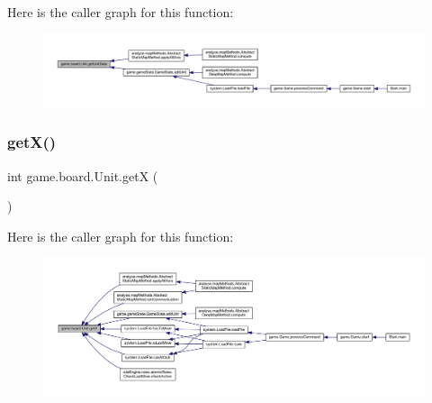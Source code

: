 Here is the caller graph for this function\+:
\nopagebreak
\begin{figure}[H]
\begin{center}
\leavevmode
\includegraphics[width=350pt]{classgame_1_1board_1_1_unit_a165d186d9ffb91527d90807134dbe212_icgraph}
\end{center}
\end{figure}
\mbox{\label{classgame_1_1board_1_1_unit_a83e3e2551f8750d2107e366e279adb4d}} 
\subsubsection{\texorpdfstring{get\+X()}{getX()}}
{\footnotesize\ttfamily int game.\+board.\+Unit.\+getX (\begin{DoxyParamCaption}{ }\end{DoxyParamCaption})\hspace{0.3cm}{\ttfamily [inline]}}

Here is the caller graph for this function\+:
\nopagebreak
\begin{figure}[H]
\begin{center}
\leavevmode
\includegraphics[width=350pt]{classgame_1_1board_1_1_unit_a83e3e2551f8750d2107e366e279adb4d_icgraph}
\end{center}
\end{figure}
\mbox{\label{classgame_1_1board_1_1_unit_a99a707f9342b07b4342ffec748696d27}} 
